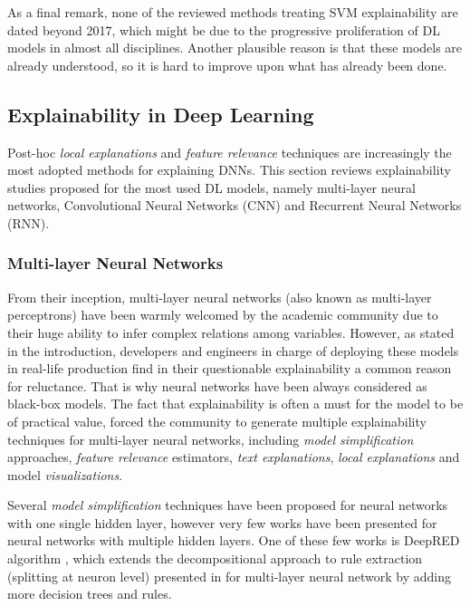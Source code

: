 \documentclass[final]{elsarticle}
\begin{document}
As a final remark, none of the reviewed methods treating SVM explainability are dated beyond 2017, which might be due to the progressive proliferation of DL models in almost all disciplines. Another plausible reason is that these models are already understood, so it is hard to improve upon what has already been done.

\subsection{Explainability in Deep Learning} \label{ssec:deep-posthoc}

Post-hoc \textit{local explanations} and \textit{feature relevance} techniques are increasingly the most adopted methods for explaining DNNs. 
This section reviews explainability studies proposed for the most used DL models, namely multi-layer neural networks, Convolutional Neural Networks (CNN) and Recurrent Neural Networks (RNN).
 
\subsubsection{Multi-layer Neural Networks}

From their inception, multi-layer neural networks (also known as multi-layer perceptrons) have been warmly welcomed by the academic community due to their huge ability to infer complex relations among variables. However, as stated in the introduction, developers and engineers in charge of deploying these models in real-life production find in their questionable explainability a common reason for reluctance. That is why neural networks have been always considered as black-box models. The fact that explainability is often a must for the model to be of practical value, forced the community to generate multiple explainability techniques for multi-layer neural networks, including \textit{model simplification} approaches, \textit{feature relevance} estimators, \textit{text explanations}, \textit{local explanations} and model \textit{visualizations}. 

Several \textit{model simplification} techniques have been proposed for neural networks with one single hidden layer, however very few works have been presented for neural networks with multiple hidden layers. One of these few works is DeepRED algorithm \cite{zilke2016deepred}, which extends the decompositional approach to rule extraction (splitting at neuron level) presented in \cite{CRED} for multi-layer neural network by adding more decision trees and rules.
\end{document}
